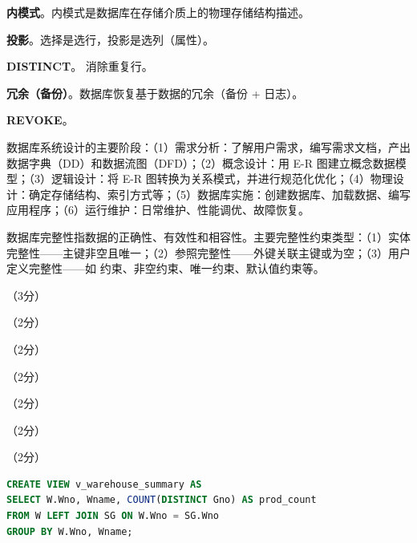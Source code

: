 \documentclass[a4paper,11pt]{article}
\begin{document}


\q \textbf{内模式}。内模式是数据库在存储介质上的物理存储结构描述。

\q \textbf{投影}。选择是选行，投影是选列（属性）。

\q \textbf{DISTINCT}。 消除重复行。

\q \textbf{冗余（备份）}。数据库恢复基于数据的冗余（备份 + 日志）。

\q \textbf{REVOKE}。


\q 数据库系统设计的主要阶段：（1）需求分析：了解用户需求，编写需求文档，产出数据字典（DD）和数据流图（DFD）；（2）概念设计：用 E-R 图建立概念数据模型；（3）逻辑设计：将 E-R 图转换为关系模式，并进行规范化优化；（4）物理设计：确定存储结构、索引方式等；（5）数据库实施：创建数据库、加载数据、编写应用程序；（6）运行维护：日常维护、性能调优、故障恢复。

\q 数据库完整性指数据的正确性、有效性和相容性。主要完整性约束类型：（1）实体完整性——主键非空且唯一；（2）参照完整性——外键关联主键或为空；（3）用户定义完整性——如  约束、非空约束、唯一约束、默认值约束等。


\q （3分）

\q （2分）

\q （2分）

\q （2分）

\q （2分）

\q （2分）

\q （2分）
\begin{lstlisting}[language=SQL]
CREATE VIEW v_warehouse_summary AS
SELECT W.Wno, Wname, COUNT(DISTINCT Gno) AS prod_count
FROM W LEFT JOIN SG ON W.Wno = SG.Wno
GROUP BY W.Wno, Wname;
\end{lstlisting}

\end{document}

